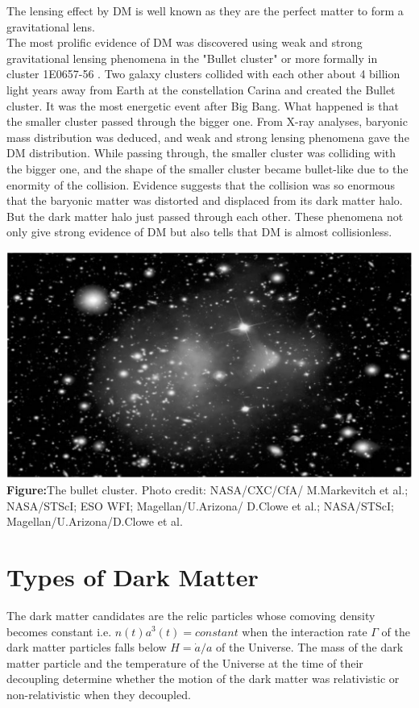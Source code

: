 \documentclass[12pt]{report}
\begin{document}
The lensing effect by DM is well known as they are the perfect matter to form a gravitational lens.\\

The most prolific evidence of DM was discovered using weak and strong gravitational lensing phenomena in the "Bullet cluster" or more formally in cluster 1E0657-56 \cite{dmtheory1}. Two galaxy clusters collided with each other about 4 billion light years away from Earth at the constellation Carina and created the Bullet cluster. It was the most energetic event after Big Bang. What happened is that the smaller cluster passed through the bigger one. From X-ray analyses, baryonic mass distribution was deduced, and weak and strong lensing phenomena gave the DM distribution. While passing through, the smaller cluster was colliding with the bigger one, and the shape of the smaller cluster became bullet-like due to the enormity of the collision. Evidence suggests that the collision was so enormous that the baryonic matter was distorted and displaced from its dark matter halo. But the dark matter halo just passed through each other. These phenomena not only give strong evidence of DM but also tells that DM is almost collisionless. \cite{dmtheory1}

\begin{center}
\includegraphics[scale=0.3]{bclstr.png}\\
\textbf{Figure:}The bullet cluster. Photo credit: NASA/CXC/CfA/ M.Markevitch et
al.; NASA/STScI; ESO WFI; Magellan/U.Arizona/ D.Clowe et al.;
NASA/STScI; Magellan/U.Arizona/D.Clowe et al.
\cite{dmtheory1}
\end{center}

 


\section{Types of Dark Matter}
The dark matter candidates are the relic particles whose comoving density becomes constant i.e. $n(t) a^3(t)= constant$ when the interaction rate $\Gamma$ of the dark matter particles falls below $H= \dot{a}/a$ of the Universe. The mass of the dark matter particle and the temperature of the Universe at the time of their decoupling determine whether the motion of the dark matter was relativistic or non-relativistic when they decoupled.\\
\end{document}
